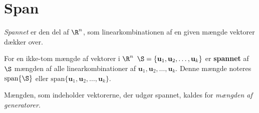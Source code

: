 \section{Span}
\textit{Spannet} er den del af $\R^n$, som linearkombinationen af en given mængde vektorer dækker over. 
%
\begin{defn}{}{}
%
For en ikke-tom mængde af vektorer i $\R^n$ $\S = \{\mathbf{u}_1, \mathbf{u}_2 , \ldots , \mathbf{u}_k \}$ er \textbf{spannet} af $\S$ mængden af alle linearkombinationer af $\mathbf{u}_1, \mathbf{u}_2 , \ldots , \mathbf{u}_k$. 
Denne mængde noteres $\text{span} \{ \S \}$ eller $\text{span}\{ \mathbf{u}_1, \mathbf{u}_2 , \ldots , \mathbf{u}_k \}$.
%
\end{defn}
%
\noindent
Mængden, som indeholder vektorerne, der udgør spannet, kaldes for \textit{mængden af generatorer}.
\\
%
%
